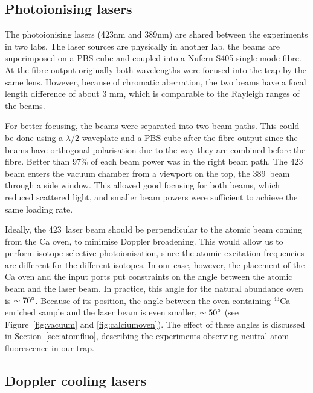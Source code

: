 \subsection{Photoionising lasers}
\label{subsec:photionlayout}

The photoionising lasers (423nm and 389nm) are shared between the experiments in two labs. The laser sources are physically in another lab, the beams are superimposed on a PBS cube and coupled into a Nufern S405 single-mode fibre. At the fibre output originally both wavelengths were focused into the trap by the same lens. However, because of chromatic aberration, the two beams have a focal length difference of about 3 mm, which is comparable to the Rayleigh ranges of the beams.

For better focusing, the beams were separated into two beam paths. This could be done using a $\lambda/2$  waveplate and a PBS cube after the fibre output since the beams have orthogonal polarisation due to the way they are combined before the fibre. Better than 97\% of each beam power was in the right beam path. The 423\nm\, beam enters the vacuum chamber from a viewport on the top, the 389\nm\, beam through a side window. This allowed good focusing for both beams, which reduced scattered light, and smaller beam powers were sufficient to achieve the same loading rate.

Ideally, the 423\nm\, laser beam should be perpendicular to the atomic beam coming from the Ca oven, to minimise Doppler broadening. This would allow us to perform isotope-selective photoionisation, since the atomic excitation frequencies are different for the different \CaI{} isotopes. In our case, however, the placement of the Ca oven and the input ports put constraints on the angle between the atomic beam and the laser beam. In practice, this angle for  the natural abundance \CaI{} oven is $\sim 70\mbox{$^{\circ}$}$. Because of its position, the angle between the oven containing $^{43}$Ca enriched sample and the laser beam is even smaller, $\sim 50\mbox{$^{\circ}$}$ (see Figure~\ref{fig:vacuum} and \ref{fig:calciumoven}). The effect of these angles is discussed in Section~\ref{sec:atomfluo}, describing the experiments observing neutral atom fluorescence in our trap.


\subsection{Doppler cooling lasers}
\label{subsec:dopplertrapsetup}


